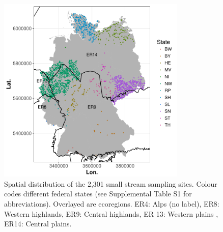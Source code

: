 \documentclass[pdftex,
	a4paper,
	titlepage=false]{scrreprt}
\begin{document}
\begin{figure}[ht]
	\centering
	\includegraphics[width = 0.8\textwidth]{fig_map}
	\caption[Spatial distribution of the 2,301 small stream sampling sites.]{Spatial distribution of the 2,301 small stream sampling sites. Colour codes different federal states (see Supplemental Table S1 for abbreviations). Overlayed are ecoregions. ER4: Alps (no label), ER8: Western highlands,
	ER9: Central highlands, ER 13: Western plains , ER14: Central plains. }
	\label{fig:ecoreg}
\end{figure}



\end{document}
